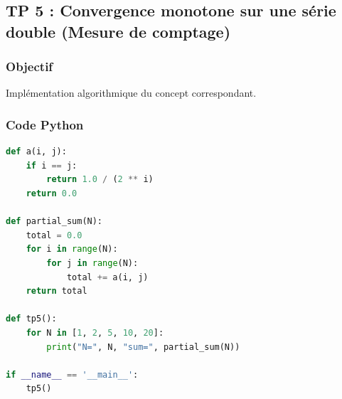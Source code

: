 \documentclass[11pt,a4paper]{article}
\begin{document}
\subsection*{TP 5 : Convergence monotone sur une série double (Mesure de comptage)}

\subsubsection*{Objectif}
Implémentation algorithmique du concept correspondant.

\subsubsection*{Code Python}
\begin{lstlisting}[language=python]
def a(i, j):
    if i == j:
        return 1.0 / (2 ** i)
    return 0.0

def partial_sum(N):
    total = 0.0
    for i in range(N):
        for j in range(N):
            total += a(i, j)
    return total

def tp5():
    for N in [1, 2, 5, 10, 20]:
        print("N=", N, "sum=", partial_sum(N))

if __name__ == '__main__':
    tp5()
\end{lstlisting}
\end{document}
